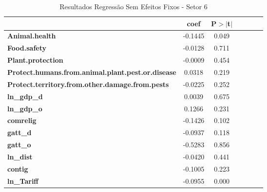 \begin{table}
    
    \begin{center}
        \begin{tabular}{lcccccc}
            & \textbf{coef} & \textbf{P$> |$t$|$}\\
            \midrule
\textbf{Animal.health}                                    &      -0.1445 &         0.049\\
\textbf{Food.safety}                                      &      -0.0128 &         0.711\\
\textbf{Plant.protection}                                 &      -0.0009 &         0.454\\
\textbf{Protect.humans.from.animal.plant.pest.or.disease} &       0.0318 &         0.219\\
\textbf{Protect.territory.from.other.damage.from.pests}   &      -0.0225 &         0.252\\
\textbf{ln\_gdp\_d}                                       &       0.0039 &         0.675\\
\textbf{ln\_gdp\_o}                                       &       0.1266 &         0.231\\
\textbf{comrelig}                                         &      -0.1426 &         0.102\\
\textbf{gatt\_d}                                          &      -0.0937 &         0.118\\
\textbf{gatt\_o}                                          &      -0.5283 &         0.856\\
\textbf{ln\_dist}                                         &      -0.0420 &         0.441\\
\textbf{contig}                                           &      -0.1005 &         0.223\\
\textbf{ln\_Tariff}                                       &      -0.0955 &         0.000\\
\bottomrule
\end{tabular}
\caption{Resultados Regressão Sem Efeitos Fixos - Setor 6}
\end{center}
\end{table}